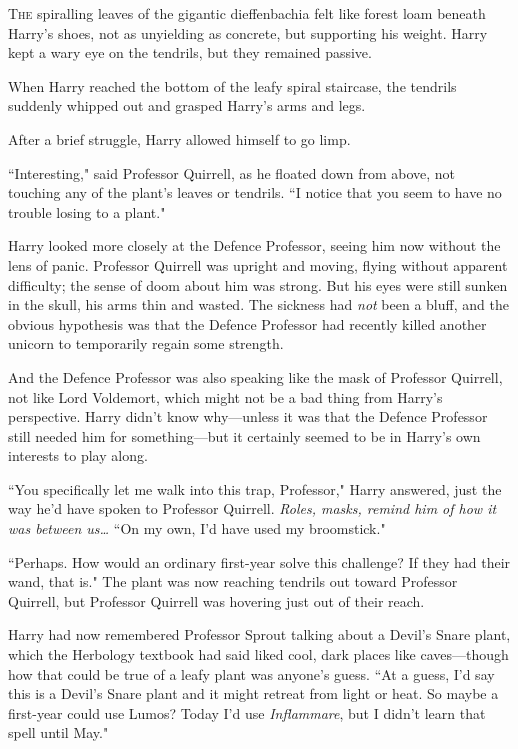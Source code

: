 
\lettrine{T}{he} spiralling leaves of the gigantic dieffenbachia felt like forest loam beneath Harry's shoes, not as unyielding as concrete, but supporting his weight. Harry kept a wary eye on the tendrils, but they remained passive.

When Harry reached the bottom of the leafy spiral staircase, the tendrils suddenly whipped out and grasped Harry's arms and legs.

After a brief struggle, Harry allowed himself to go limp.

``Interesting," said Professor Quirrell, as he floated down from above, not touching any of the plant's leaves or tendrils. ``I notice that you seem to have no trouble losing to a plant."

Harry looked more closely at the Defence Professor, seeing him now without the lens of panic. Professor Quirrell was upright and moving, flying without apparent difficulty; the sense of doom about him was strong. But his eyes were still sunken in the skull, his arms thin and wasted. The sickness had \emph{not} been a bluff, and the obvious hypothesis was that the Defence Professor had recently killed another unicorn to temporarily regain some strength.

And the Defence Professor was also speaking like the mask of Professor Quirrell, not like Lord Voldemort, which might not be a bad thing from Harry's perspective. Harry didn't know why—unless it was that the Defence Professor still needed him for something—but it certainly seemed to be in Harry's own interests to play along.

``You specifically let me walk into this trap, Professor," Harry answered, just the way he'd have spoken to Professor Quirrell. \emph{Roles, masks, remind him of how it was between us…} ``On my own, I'd have used my broomstick."

``Perhaps. How would an ordinary first-year solve this challenge? If they had their wand, that is." The plant was now reaching tendrils out toward Professor Quirrell, but Professor Quirrell was hovering just out of their reach.

Harry had now remembered Professor Sprout talking about a Devil's Snare plant, which the Herbology textbook had said liked cool, dark places like caves—though how that could be true of a leafy plant was anyone's guess. ``At a guess, I'd say this is a Devil's Snare plant and it might retreat from light or heat. So maybe a first-year could use Lumos? Today I'd use \emph{Inflammare}, but I didn't learn that spell until May."

